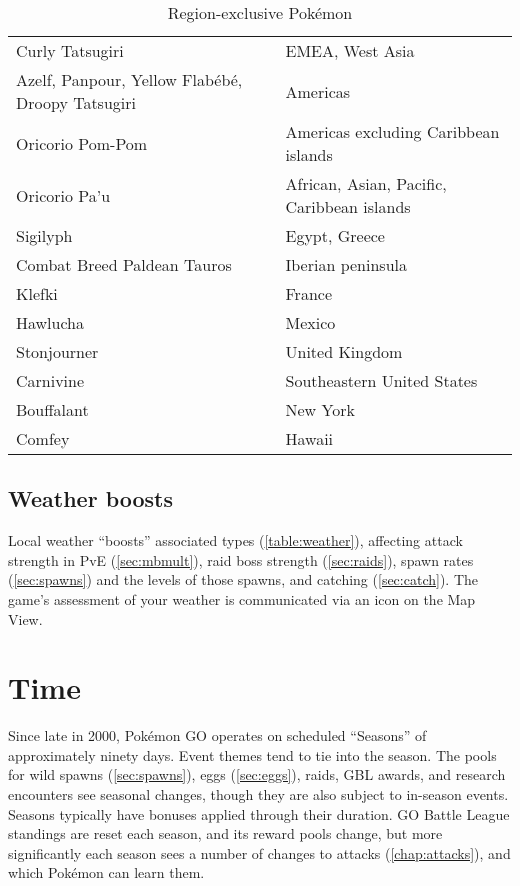 \begin{table}
\begin{tabular}{p{}l}
Curly Tatsugiri & EMEA, West Asia\\
\rowcolor{Gray!25}
Azelf, Panpour, Yellow Flabébé, Droopy Tatsugiri & Americas\\
Oricorio Pom-Pom & Americas excluding Caribbean islands\\
\rowcolor{Gray!25}
Oricorio Pa'u & African, Asian, Pacific, Caribbean islands\\
Sigilyph & Egypt, Greece\\
\rowcolor{Gray!25}
Combat Breed Paldean Tauros & Iberian peninsula\\
Klefki & France\\
\rowcolor{Gray!25}
Hawlucha & Mexico\\
Stonjourner & United Kingdom\\
\rowcolor{Gray!25}
Carnivine & Southeastern United States\\
Bouffalant & New York\\
\rowcolor{Gray!25}
Comfey & Hawaii\\
\end{tabular}
\caption{Region-exclusive Pokémon\label{table:regional}}
\end{table}
\subsection{Weather boosts\label{sec:weather}}
Local weather ``boosts'' associated types (\autoref{table:weather}),
  affecting attack strength in PvE (\autoref{sec:mbmult}),
  raid boss strength (\autoref{sec:raids}),
  spawn rates (\autoref{sec:spawns}) and the levels of those spawns,
  and catching (\autoref{sec:catch}).
The game's assessment of your weather is communicated via an icon on the Map View.
\begin{table}

\end{table}
\section{Time\label{sec:timeline}}
Since late in 2000, Pokémon GO operates on scheduled ``Seasons'' of approximately ninety days.
Event themes tend to tie into the season.
The pools for wild spawns (\autoref{sec:spawns}), eggs (\autoref{sec:eggs}), raids, GBL awards,
 and research encounters see seasonal changes, though they are also subject to in-season events.
Seasons typically have bonuses applied through their duration.
GO Battle League standings are reset each season, and its reward pools change, but
 more significantly each season sees a number of changes to attacks (\autoref{chap:attacks}),
 and which Pokémon can learn them.

